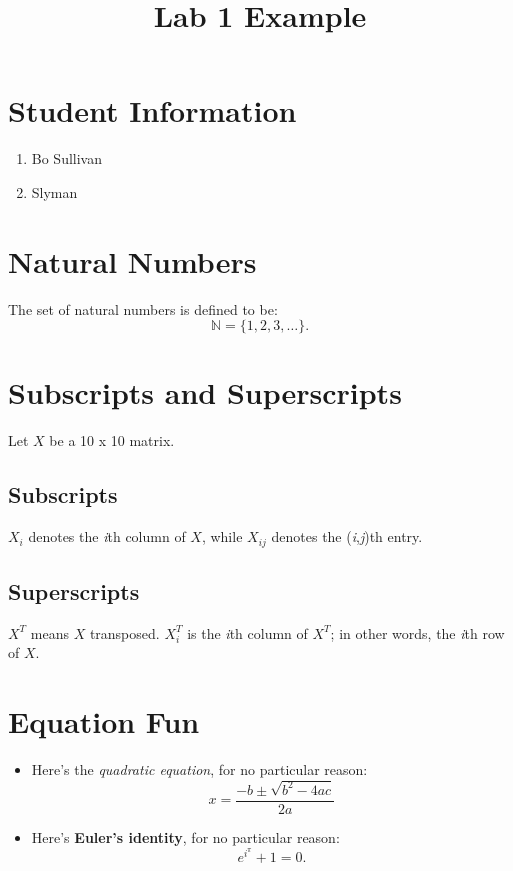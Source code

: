 \documentclass{article}
\title{Lab 1 Example}
\begin{document}
\date{}
\maketitle

\section{Student Information}
\begin{enumerate}
\item Bo Sullivan
\item Slyman
\end{enumerate}

\section{Natural Numbers}
The set of natural numbers is defined to be:
\begin{equation}
    \mathbb{N} = \{1,2,3,\ldots\}.\end{equation}
\section{Subscripts and Superscripts}
Let $X$ be a 10 x 10 matrix.
\subsection{Subscripts}
$X_i$ denotes the \textit{i}th column of $X$, while $X_{ij}$ denotes the (\textit{i},\textit{j})th entry.
\subsection{Superscripts}
$X^T$ means $X$ transposed. $X^T_i$ is the \textit{i}th column of $X^T$; in other words, the \textit{i}th row of $X$.
\section{Equation Fun}
\begin{itemize}
    \item Here's the \textit{quadratic equation}, for no particular reason:
    \begin{equation}x = \frac{-b \pm \sqrt{b^2 - 4ac}}{2a}
    \end{equation}
    \item Here's \textbf{Euler's identity}, for no particular reason:
    \begin{equation}e^i^\pi + 1 = 0.
    \end{equation}
\end{itemize}
\setlength{\footskip}{125pt}
\end{document}
